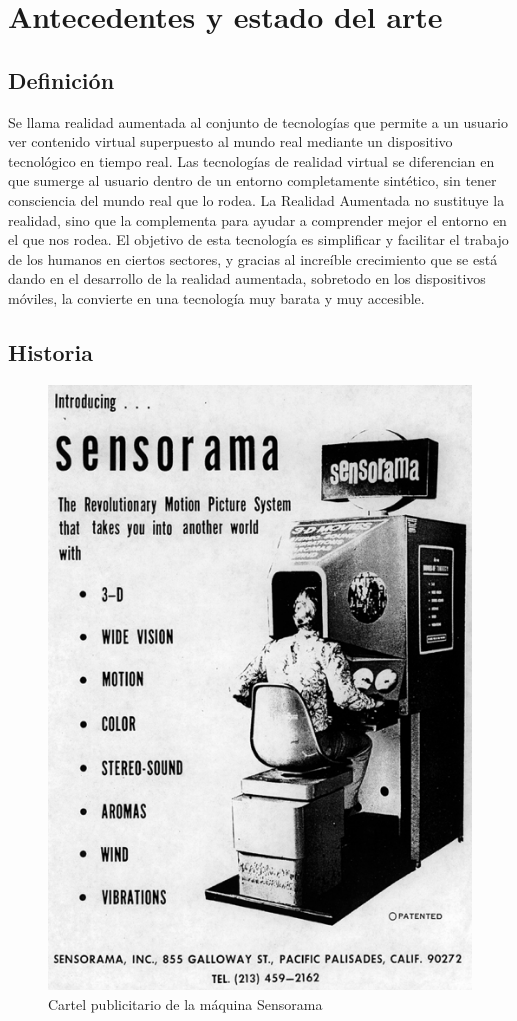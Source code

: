 \chapter{Antecedentes y estado del arte}
\section{Definición}
Se llama realidad aumentada al conjunto de tecnologías que permite a un usuario ver contenido virtual superpuesto al mundo real mediante un dispositivo tecnológico en tiempo real. Las tecnologías de realidad virtual se diferencian en que sumerge al usuario dentro de un entorno completamente sintético, sin tener consciencia del mundo real que lo rodea. La Realidad Aumentada no sustituye la realidad, sino que la complementa para ayudar a comprender mejor el entorno en el que nos rodea. El objetivo de esta tecnología es simplificar y facilitar el trabajo de los humanos en ciertos sectores, y gracias al increíble crecimiento que se está dando en el desarrollo de la realidad aumentada, sobretodo en los dispositivos móviles, la convierte en una tecnología muy barata y muy accesible.

\section{Historia}
\begin{figure}
    \centering
    \includegraphics{Images/Sensorama.png}
    \caption{Cartel publicitario de la máquina Sensorama}
    \label{fig:Sensorama}
\end{figure}

